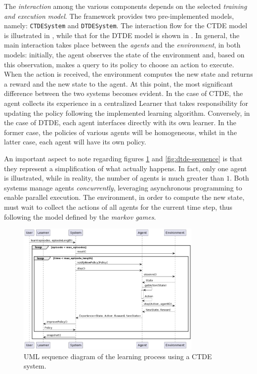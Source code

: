 \documentclass[12pt,a4paper,openright,twoside]{book}
\begin{document}
The \emph{interaction} among the various components depends on the selected \emph{training and execution model}. 
    The framework provides two pre-implemented models, namely: \texttt{CTDESystem} and \texttt{DTDESystem}. 
    The interaction flow for the CTDE model is illustrated in , while that for the DTDE model is shown in
    . In general, the main interaction takes place between the \emph{agents} and the \emph{environment}, in both models: 
    initially, the agent observes the state of the environment and, based on this observation, 
    makes a query to its policy to choose an action to execute. When the action is received, the environment computes 
    the new state and returns a reward and the new state to the agent.
    At this point, the most significant difference between the two systems becomes evident. In the case of CTDE, the agent collects its experience 
    in a centralized Learner that takes responsibility for updating the policy following the implemented learning algorithm. Conversely, in the case of 
    DTDE, each agent interfaces directly with its own learner. In the former case, the policies of various agents will be homogeneous, 
    whilst in the latter case, each agent will have its own policy.

An important aspect to note regarding figures \ref{fig:ctde-sequence} and \ref{fig:dtde-sequence} is that they represent a simplification of what actually happens. 
    In fact, only one agent is illustrated, while in reality, the number of agents is much greater than $1$. Both systems manage agents \emph{concurrently}, 
    leveraging asynchronous programming to enable parallel execution. The environment, in order to compute the new state,
    must wait to collect the actions of all agents for the current time step, thus following the model defined by
    the \emph{markov games}\cite{LITTMAN1994157}. 

\begin{figure}[t]
    \centering
    \includegraphics[width=0.8\textwidth]{figures/CTDE-System-Sequence-Diagram.png}
    \caption{UML sequence diagram of the learning process using a CTDE system.}
    \label{fig:ctde-sequence}
\end{figure}
\end{document}
